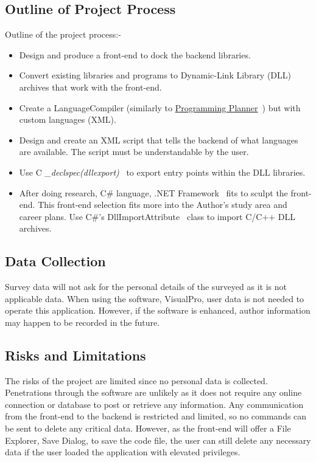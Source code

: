 \documentclass[conference]{IEEEtran}
\begin{document}
      \subsection{Outline of Project Process}
        Outline of the project process:-
        \begin{itemize}
          \item Design and produce a front-end to dock the backend libraries.
          \item Convert existing libraries and programs to Dynamic-Link Library (DLL) archives that work with the front-end.
          \item Create a LanguageCompiler (similarly to \href{https://github.com/ShinkuKira21/VisualPro-FinalProject/tree/main/Experience}{Programming Planner}~\cite{patch_programming_2021}) but with custom languages (XML).
          \item Design and create an XML script that tells the backend of what languages are available. The script must be understandable by the user.
          \item Use C \textit{\_declspec(dllexport)}~\cite{microsoft_exporting_2019} to export entry points within the DLL libraries.
          \item After doing research, C\# language, .NET Framework~\cite{microsoft_what_nodate} fits to sculpt the front-end. This front-end selection fits more into the Author's study area and career plans. Use C\#'s DllImportAttribute~\cite{microsoft_dllimportattribute_nodate} class to import C/C++ DLL archives.
        \end{itemize}
        
      \subsection{Data Collection}
        Survey data will not ask for the personal details of the surveyed as it is not applicable data. When using the software, VisualPro, user data is not needed to operate this application. However, if the software is enhanced, author information may happen to be recorded in the future.

      \subsection{Risks and Limitations}
        The risks of the project are limited since no personal data is collected. Penetrations through the software are unlikely as it does not require any online connection or database to post or retrieve any information. Any communication from the front-end to the backend is restricted and limited, so no commands can be sent to delete any critical data. However, as the front-end will offer a File Explorer, Save Dialog, to save the code file, the user can still delete any necessary data if the user loaded the application with elevated privileges.
\end{document}
